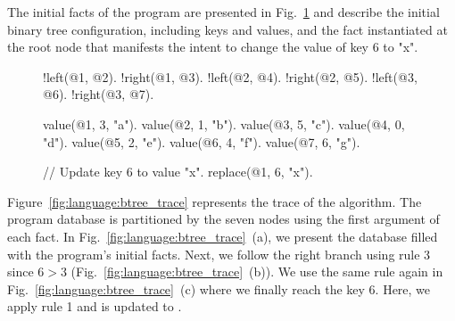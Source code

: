 The initial facts of the program are presented in
Fig.~\ref{code:language:btree_replace_initial} and describe the initial binary
tree configuration, including keys and values, and the  fact instantiated at the root node  that manifests the intent to
change the value of key 6 to "x".

\begin{figure}[ht]
\begin{LineCode}[commandchars=\*\{\}]
!left(@1, @2).
!right(@1, @3).
!left(@2, @4).
!right(@2, @5). 
!left(@3, @6).
!right(@3, @7).

value(@1, 3, "a").
value(@2, 1, "b").
value(@3, 5, "c").
value(@4, 0, "d").
value(@5, 2, "e").
value(@6, 4, "f").
value(@7, 6, "g").

// Update key 6 to value "x".
replace(@1, 6, "x").
\end{LineCode}
\label{code:language:btree_replace_initial}
\end{figure}

Figure~\ref{fig:language:btree_trace} represents the trace of the algorithm. The program
database is partitioned by the seven nodes using the first argument of each
fact. In Fig.~\ref{fig:language:btree_trace}~(a), we present the database filled with the
program's initial facts. Next, we follow the right branch using rule 3 since $6
> 3$ (Fig.~\ref{fig:language:btree_trace}~(b)).  We use the same rule again in
Fig.~\ref{fig:language:btree_trace}~(c) where we finally reach the key 6. Here, we apply
rule 1 and  is updated to .

